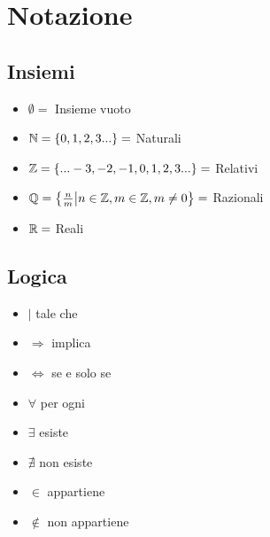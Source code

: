 
\chapter{Notazione} %

\label{ch:notazione} %


\section{Insiemi}
\begin{itemize}
  \item $\emptyset = $ Insieme vuoto
  \item $\mathbb{N} = \{0,1,2,3...\} = $ Naturali
  \item $\mathbb{Z} = \{...-3,-2,-1,0,1 ,2,3...\} = $ Relativi
  \item $\mathbb{Q} = \left\{ \frac{n}{m} \middle| n \in \mathbb{Z} , m \in \mathbb{Z} , m \neq 0 \right\} = $ Razionali
  \item $\mathbb{R} = $ Reali
\end{itemize}

\section{Logica}
\begin{itemize}
  \item $| $ tale che
  \item $ \Rightarrow $ implica
  \item $ \Leftrightarrow $ se e solo se
  \item $ \forall $ per ogni
  \item $ \exists $ esiste
  \item $ \nexists $ non esiste
  \item $ \in $ appartiene
  \item $ \notin $ non appartiene
\end{itemize}

